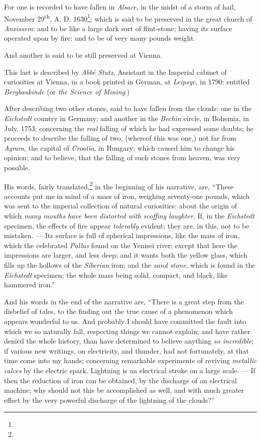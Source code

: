 \documentclass[a4paper, 12pt, oneside]{article}
\begin{document}
For one is recorded to have fallen in \emph{Alsace}, in the midst of a storm of hail, November 29\textsuperscript{th}, A. D. 1630\footnote{}; which is said to be preserved in the great church of \emph{Anxissem}: and to be like a large dark sort of flint-stone; having its surface operated upon by fire: and to be of very many pounds weight.

And another is said to be still preserved at Vienna.

This last is described by \emph{Abbé Stutz}, Assistant in the Imperial cabinet of curiosities at Vienna, in a book printed in German, at \emph{Leipsyc}, in 1790: entitled \emph{Bergbaukinde} (or \emph{the Science of Mining}.)

After describing two other stones, said to have fallen from the clouds: one in the \emph{Eichstedt} country in Germany; and another in the \emph{Bechin} circle, in Bohemia, in July, 1753; concerning the \emph{real} falling of which he had expressed some doubts; he proceeds to describe the falling of two, (whereof this was one,) not far from \emph{Agram}, the capital of \emph{Croatia}, in Hungary; which caused him to change his opinion; and to believe, that the falling of such stones from heaven, was very possible.

His words, fairly translated,\footnote{} in the beginning of his narrative, are, ``These accounts put me in mind of a mass of iron, weighing seventy-one pounds, which was sent to the imperial collection of natural curiosities: about the origin of which \emph{many mouths have been distorted with scoffing laughter}. If, in the \emph{Eichstedt} specimen, the effects of fire appear \emph{tolerably} evident; they are, in this, not to be mistaken. --- Its surface is full of spherical impressions, like the mass of iron, which the celebrated \emph{Pallas} found on the Yenisei river; except that here the impressions are larger, and less deep; and it wants both the yellow glass, which fills up the hollows of the \emph{Siberian} iron; and the \emph{sand stone}, which is found in the \emph{Eichstedt} specimen; the whole mass being solid, compact, and black, like hammered iron.''

And his words in the end of the narrative are, ``There is a great step from the disbelief of tales, to the finding out the true cause of a phenomenon which appears wonderful to us. And probably I should have committed the fault into which we so naturally fall, respecting things we cannot explain; and have rather denied the whole history, than have determined to believe anything \emph{so incredible}; if various new writings, on electricity, and thunder, had not fortunately, at that time come into my hands; concerning remarkable experiments of reviving \emph{metallic calces} by the electric spark. Lightning is an electrical stroke on a large scale. --- If then the reduction of iron can be obtained, by the discharge of an electrical machine; why should not this be accomplished as well, and with much greater effect by the very powerful discharge of the lightning of the clouds?''
\end{document}
